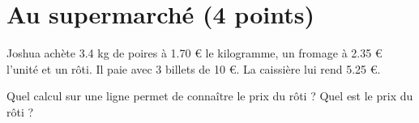 \section{Au supermarché (4 points)}

Joshua achète \num{3.4} kg de poires à \num{1,70} € le kilogramme, un fromage à \num{2.35} € l'unité et un rôti.
Il paie avec 3 billets de 10 €. La caissière lui rend \num{5.25} €.

\begin{questions}
	\question[2] Quel calcul sur une ligne permet de connaître le prix du rôti ?
	\question[2] Quel est le prix du rôti ?
\end{questions}